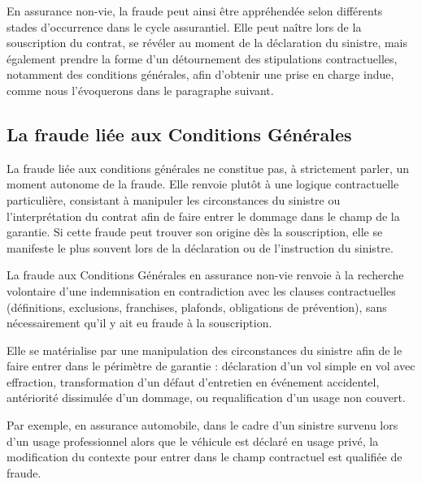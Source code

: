 En assurance non-vie, la fraude peut ainsi être appréhendée selon différents stades d'occurrence dans le cycle assurantiel. Elle peut naître lors de la souscription du contrat, se révéler au moment de la déclaration du sinistre, mais également prendre la forme d'un détournement des stipulations contractuelles, notamment des conditions générales, afin d'obtenir une prise en charge indue, comme nous l'évoquerons dans le paragraphe suivant.

\subsection{La fraude liée aux Conditions Générales}

La fraude liée aux conditions générales ne constitue pas, à strictement parler, un moment autonome de la fraude. Elle renvoie plutôt à une logique contractuelle particulière, consistant à manipuler les circonstances du sinistre ou l'interprétation du contrat afin de faire entrer le dommage dans le champ de la garantie. Si cette fraude peut trouver son origine dès la souscription, elle se manifeste le plus souvent lors de la déclaration ou de l'instruction du sinistre.

La fraude aux Conditions Générales en assurance non-vie renvoie à la recherche volontaire d'une indemnisation en contradiction avec les clauses contractuelles (définitions, exclusions, franchises, plafonds, obligations de prévention), sans nécessairement qu'il y ait eu fraude à la souscription.

Elle se matérialise par une manipulation des circonstances du sinistre afin de le faire entrer dans le périmètre de garantie : déclaration d'un vol simple en vol avec effraction, transformation d'un défaut d'entretien en événement accidentel, antériorité dissimulée d'un dommage, ou requalification d'un usage non couvert.

Par exemple, en assurance automobile, dans le cadre d'un sinistre survenu lors d'un usage professionnel alors que le véhicule est déclaré en usage privé, la modification du contexte pour entrer dans le champ contractuel est qualifiée de fraude.

